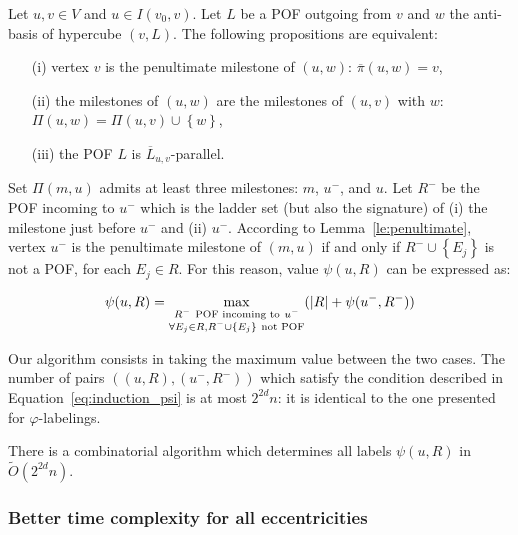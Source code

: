 \documentclass[a4paper,UKenglish,numberwithinsect,cleveref, autoref]{lipics-v2021}
\newcommand{\set}[1]{\left\{ #1 \right\}}
\newcommand{\card}[1]{\left| #1 \right|}
\begin{document}
\begin{lemma}
Let $u,v \in V$ and $u \in I(v_0,v)$. Let $L$ be a POF outgoing from $v$ and $w$ the anti-basis of hypercube $(v,L)$. The following propositions are equivalent:
\begin{enumerate}
\item[(i)] vertex $v$ is the penultimate milestone of $(u,w)$: $\overline{\pi}(u,w) = v$,
\item[(ii)] the milestones of $(u,w)$ are the milestones of $(u,v)$ with $w$: $\Pi(u,w) = \Pi(u,v) \cup \set{w}$,
\item[(iii)] the POF $L$ is $\overline{L}_{u,v}$-parallel.
\end{enumerate}
\label{le:penultimate}
\end{lemma}

Set $\Pi(m,u)$ admits at least three milestones: $m$, $u^-$, and $u$. Let $R^-$ be the POF incoming to $u^-$ which is the ladder set (but also the signature) of (i) the milestone just before $u^-$ and (ii) $u^-$. According to Lemma~\ref{le:penultimate}, vertex $u^-$ is the penultimate milestone of $(m,u)$ if and only if $R^- \cup \set{E_j}$ is not a POF, for each $E_j \in R$. For this reason, value $\psi(u,R)$ can be expressed as:

\begin{equation}
\psi(u,R) = \max\limits_{\substack{R^- ~\mbox{\scriptsize{POF incoming to}}~ u^- \\ \forall E_j \in R, R^- \cup \set{E_j} ~\mbox{\scriptsize{not POF}}}} (\card{R} + \psi(u^-,R^-))
\label{eq:induction_psi}
\end{equation}

Our algorithm consists in taking the maximum value between the two cases. The number of pairs $((u,R),(u^-,R^-))$ which satisfy the condition described in Equation~\eqref{eq:induction_psi} is at most $2^{2d}n$: it is identical to the one presented for $\varphi$-labelings.

\begin{theorem}
There is a combinatorial algorithm which determines all labels $\psi(u,R)$ in $\tilde{O}(2^{2d}n)$. 
\label{th:compute_psi}
\end{theorem}

\subsubsection{Better time complexity for all eccentricities} \label{subsubsec:ecc}
\end{document}
